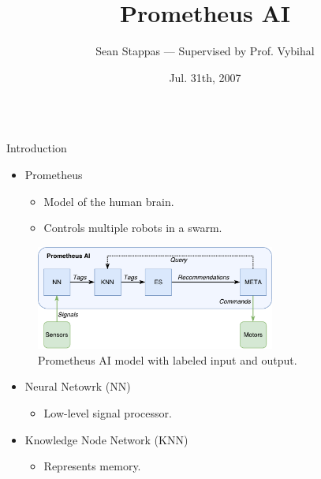 \documentclass[final]{beamer} %
\title[Fancy Posters]{Prometheus AI}
\author{Sean Stappas --- Supervised by Prof. Vybihal}
\institute[RWTH Aachen University]{}
\date{Jul. 31th, 2007}
\newlength{\columnheight}
\begin{document}
	\begin{frame}
		\begin{columns}
			\begin{column}{.3\textwidth}
				\parbox[t][\columnheight]{\textwidth}{
				\begin{block}{Introduction}
					\begin{itemize}
						\item Prometheus
						\begin{itemize}
							\item Model of the human brain.
							\item Controls multiple robots in a swarm.
						\end{itemize}
					\end{itemize}
				
					\begin{figure}[!htb]
						\includegraphics[width=0.7\textwidth]{figures/ai_model_labeled.pdf}
						\caption{Prometheus AI model with labeled input and output.}
						\label{model_labeled}
					\end{figure}
						
					\begin{itemize}
						\item Neural Netowrk (NN)
						\begin{itemize}
							\item Low-level signal processor.
						\end{itemize}
					\end{itemize}
					
					\begin{itemize}
						\item Knowledge Node Network (KNN)
						\begin{itemize}
							\item Represents memory.
						\end{itemize}
					\end{itemize}
					

\end{block}}
\end{column}
\end{columns}
\end{frame}
\end{document}
